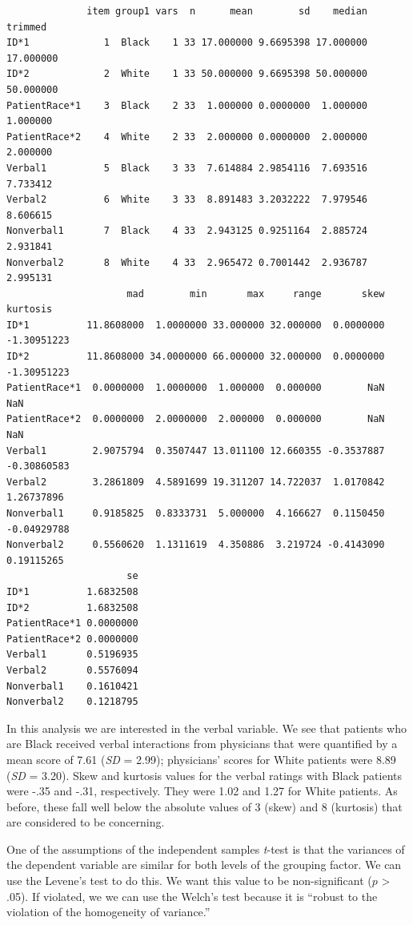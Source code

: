 \documentclass[
  11pt,
]{book}
\begin{document}
\begin{verbatim}
              item group1 vars  n      mean        sd    median   trimmed
ID*1             1  Black    1 33 17.000000 9.6695398 17.000000 17.000000
ID*2             2  White    1 33 50.000000 9.6695398 50.000000 50.000000
PatientRace*1    3  Black    2 33  1.000000 0.0000000  1.000000  1.000000
PatientRace*2    4  White    2 33  2.000000 0.0000000  2.000000  2.000000
Verbal1          5  Black    3 33  7.614884 2.9854116  7.693516  7.733412
Verbal2          6  White    3 33  8.891483 3.2032222  7.979546  8.606615
Nonverbal1       7  Black    4 33  2.943125 0.9251164  2.885724  2.931841
Nonverbal2       8  White    4 33  2.965472 0.7001442  2.936787  2.995131
                     mad        min       max     range       skew    kurtosis
ID*1          11.8608000  1.0000000 33.000000 32.000000  0.0000000 -1.30951223
ID*2          11.8608000 34.0000000 66.000000 32.000000  0.0000000 -1.30951223
PatientRace*1  0.0000000  1.0000000  1.000000  0.000000        NaN         NaN
PatientRace*2  0.0000000  2.0000000  2.000000  0.000000        NaN         NaN
Verbal1        2.9075794  0.3507447 13.011100 12.660355 -0.3537887 -0.30860583
Verbal2        3.2861809  4.5891699 19.311207 14.722037  1.0170842  1.26737896
Nonverbal1     0.9185825  0.8333731  5.000000  4.166627  0.1150450 -0.04929788
Nonverbal2     0.5560620  1.1311619  4.350886  3.219724 -0.4143090  0.19115265
                     se
ID*1          1.6832508
ID*2          1.6832508
PatientRace*1 0.0000000
PatientRace*2 0.0000000
Verbal1       0.5196935
Verbal2       0.5576094
Nonverbal1    0.1610421
Nonverbal2    0.1218795
\end{verbatim}

In this analysis we are interested in the verbal variable. We see that patients who are Black received verbal interactions from physicians that were quantified by a mean score of 7.61 (\emph{SD} = 2.99); physicians' scores for White patients were 8.89 (\emph{SD} = 3.20). Skew and kurtosis values for the verbal ratings with Black patients were -.35 and -.31, respectively. They were 1.02 and 1.27 for White patients. As before, these fall well below the absolute values of 3 (skew) and 8 (kurtosis) that are considered to be concerning.

One of the assumptions of the independent samples \emph{t}-test is that the variances of the dependent variable are similar for both levels of the grouping factor. We can use the Levene's test to do this. We want this value to be non-significant (\(p\) \textgreater{} .05). If violated, we we can use the Welch's test because it is ``robust to the violation of the homogeneity of variance.''
\end{document}
